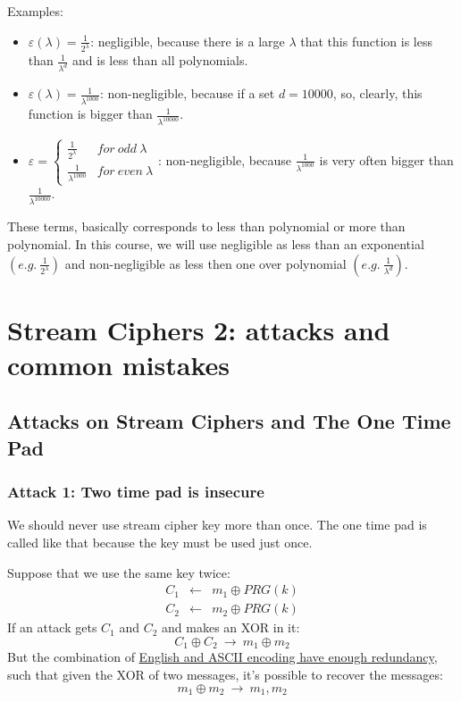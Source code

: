 \documentclass[12pt]{book}
\begin{document}
Examples:
\begin{itemize}
	\item $\varepsilon(\lambda)=\frac{1}{2^{\lambda}}$: negligible, because there is a large $\lambda$ that this function is less than $\frac{1}{\lambda^{d}}$ and is less than all polynomials.
	\item $\varepsilon(\lambda)=\frac{1}{\lambda^{1000}}$: non-negligible, because if a set $d=10000$, so, clearly, this function is bigger than $\frac{1}{\lambda^{10000}}$.
	\item $\varepsilon=\left\{\begin{array}{ll}
		\frac{1}{2^{\lambda}}&for\ odd\ \lambda\\
		\frac{1}{\lambda^{1000}}&for\ even\ \lambda
	\end{array}\right.$: non-negligible, because $\frac{1}{\lambda^{1000}}$ is very often bigger than $\frac{1}{\lambda^{10000}}$.
\end{itemize}

These terms, basically corresponds to less than polynomial or more than polynomial. In this course, we will use negligible as less than an exponential $\left(e.g.\ \frac{1}{2^{\lambda}}\right)$ and non-negligible as less then one over polynomial $\left(e.g.\ \frac{1}{\lambda^{d}}\right)$.

\newpage
\section{Stream Ciphers 2: attacks and common mistakes}
\subsection{Attacks on Stream Ciphers and The One Time Pad}
\subsubsection{Attack 1: Two time pad is insecure}
We should never use stream cipher key more than once. The one time pad is called like that because the key must be used just once.

Suppose that we use the same key twice:
$$\begin{array}{rcl}
	C_{1}&\leftarrow&m_{1}\oplus PRG(k)\\
	C_{2}&\leftarrow&m_{2}\oplus PRG(k)
\end{array}$$
If an attack gets $C_{1}$ and $C_{2}$ and makes an XOR in it:
$$C_{1}\oplus C_{2}\ \rightarrow\ m_{1}\oplus m_{2}$$
But the combination of \underline{English and ASCII encoding have enough redundancy}, such that given the XOR of two messages, it's possible to recover the messages:
$$m_{1}\oplus m_{2}\ \rightarrow\ m_{1},m_{2}$$
\end{document}
